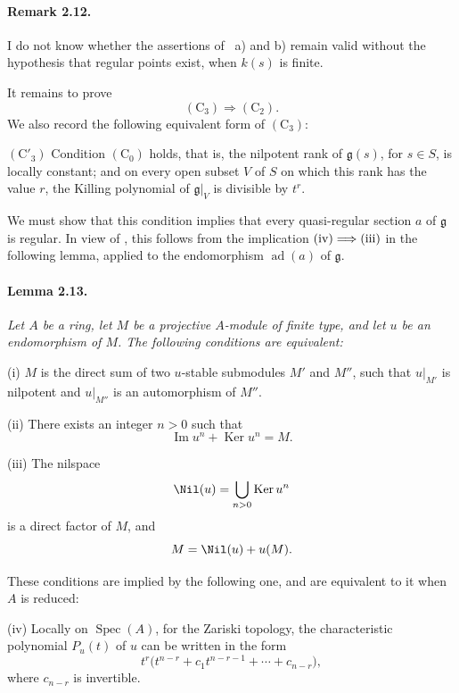 
\paragraph{\textbf{Remark 2.12.}}
I do not know whether the assertions of ~a) and b) remain valid
without the hypothesis that regular points exist, when \(k(s)\) is
finite.

It remains to prove
\[
  (\mathrm C_3)\Longrightarrow(\mathrm C_2).
\]
We also record the following equivalent form of
\((\mathrm C_3)\):

\smallskip
\noindent
\textup{\((\mathrm C'_3)\)}
Condition \((\mathrm C_0)\) holds, that is, the nilpotent rank of
\(\mathfrak g(s)\), for \(s\in S\), is locally constant; and on
every open subset \(V\) of \(S\) on which this rank has the value
\(r\), the Killing polynomial of \(\mathfrak g|_V\) is divisible
by \(t^r\).

\smallskip
We must show that this condition implies that every quasi-regular
section \(a\) of \(\mathfrak g\) is regular. In view of , this
follows from the implication
\(\textup{(iv)}\Longrightarrow\textup{(iii)}\) in the following
lemma, applied to the endomorphism
\(\operatorname{ad}(a)\) of \(\mathfrak g\).

\paragraph{\textbf{Lemma 2.13.}}
{\itshape Let \(A\) be a ring, let \(M\) be a projective
\(A\)-module of finite type, and let \(u\) be an endomorphism of
\(M\). The following conditions are equivalent:

\smallskip
\noindent
\textup{(i)}
\(M\) is the direct sum of two \(u\)-stable submodules \(M'\) and
\(M''\), such that \(u|_{M'}\) is nilpotent and \(u|_{M''}\) is an
automorphism of \(M''\).

\smallskip
\noindent
\textup{(ii)}
There exists an integer \(n>0\) such that
\[
  \operatorname{Im}u^n+\operatorname{Ker}u^n=M.
\]

\smallskip
\noindent
\textup{(iii)}
The nilspace
\[
  \Nil(u)=\bigcup_{n>0}\operatorname{Ker}u^n
\]
is a direct factor of \(M\), and
\[
  M=\Nil(u)+u(M).
\]

\smallskip
These conditions are implied by the following one, and are
equivalent to it when \(A\) is reduced:

\smallskip
\noindent
\textup{(iv)}
Locally on \(\operatorname{Spec}(A)\), for the Zariski topology, the
characteristic polynomial \(P_u(t)\) of \(u\) can be written in the
form
\[
  t^r\bigl(t^{n-r}+c_1t^{n-r-1}+\cdots+c_{n-r}\bigr),
\]
where \(c_{n-r}\) is invertible.}

